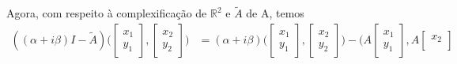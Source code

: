 \documentclass[../functional_analysis.tex]{subfiles}
\begin{document}
Agora, com respeito à complexificação de \(\mathbb{R}^{2}\) e \(\tilde{A}\) de A, temos
\begin{align*}
	((\alpha +i\beta )I - \tilde{A}) \biggl( \begin{bmatrix}
			                                         x_1 \\
			                                         y_1
		                                         \end{bmatrix}, \begin{bmatrix}
			                                                        x_2 \\
			                                                        y_2
		                                                        \end{bmatrix}\biggr) & = (\alpha +i\beta ) \biggl(\begin{bmatrix}
			                                                                                                          x_1 \\
			                                                                                                          y_1
		                                                                                                          \end{bmatrix}, \begin{bmatrix}
			                                                                                                                         x_2 \\
			                                                                                                                         y_2
		                                                                                                                         \end{bmatrix}\biggr) - \biggl(A \begin{bmatrix}
			                                                                                                                                                         x_1 \\
			                                                                                                                                                         y_1
		                                                                                                                                                         \end{bmatrix}, A\begin{bmatrix}
			                                                                                                                                                                         x_2 \\

\end{bmatrix}
\end{align*}
\end{document}
